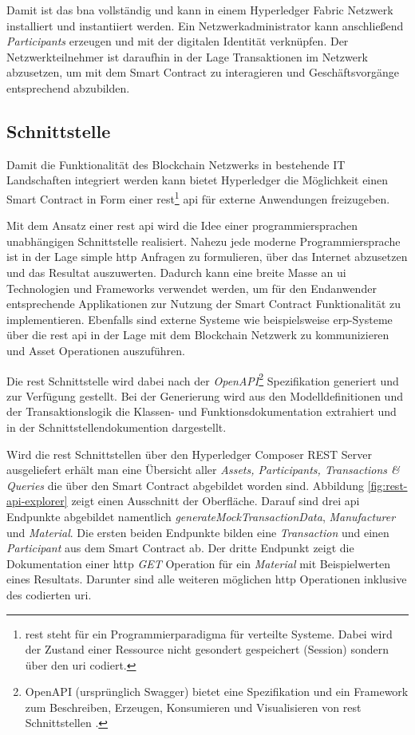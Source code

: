 \noindent
Damit ist das \acf{bna} vollständig und kann in einem Hyperledger Fabric Netzwerk installiert und instantiiert werden. Ein Netzwerkadministrator kann anschließend \textit{Participants} erzeugen und mit der digitalen Identität verknüpfen. Der Netzwerkteilnehmer ist daraufhin in der Lage Transaktionen im Netzwerk abzusetzen, um mit dem Smart Contract zu interagieren und Geschäftsvorgänge entsprechend abzubilden.

\subsection{Schnittstelle}
Damit die Funktionalität des Blockchain Netzwerks in bestehende IT Landschaften integriert werden kann bietet Hyperledger die Möglichkeit einen Smart Contract in Form einer \acs{rest}\footnote{\acf{rest} steht für ein Programmierparadigma für verteilte Systeme. Dabei wird der Zustand einer Ressource nicht gesondert gespeichert (Session) sondern über den \ac{uri} codiert.} \acs{api} für externe Anwendungen freizugeben.

Mit dem Ansatz einer \ac{rest} \ac{api} wird die Idee einer programmiersprachen unabhängigen Schnittstelle realisiert. Nahezu jede moderne Programmiersprache ist in der Lage simple \ac{http} Anfragen zu formulieren, über das Internet abzusetzen und das Resultat auszuwerten. Dadurch kann eine breite Masse an \ac{ui} Technologien und Frameworks verwendet werden, um für den Endanwender entsprechende Applikationen zur Nutzung der Smart Contract Funktionalität zu implementieren. Ebenfalls sind externe Systeme wie beispielsweise \ac{erp}-Systeme über die \ac{rest} \ac{api} in der Lage mit dem Blockchain Netzwerk zu kommunizieren und Asset Operationen auszuführen.

Die \ac{rest} Schnittstelle wird dabei nach der \textit{OpenAPI}\footnote{OpenAPI (ursprünglich Swagger) bietet eine Spezifikation und ein Framework zum Beschreiben, Erzeugen, Konsumieren und Visualisieren von \ac{rest} Schnittstellen \citep{OAI2018, Purushothaman2015}.} Spezifikation generiert und zur Verfügung gestellt. Bei der Generierung wird aus den Modelldefinitionen und der Transaktionslogik die Klassen- und Funktionsdokumentation extrahiert und in der Schnittstellendokumention dargestellt.

Wird die \ac{rest} Schnittstellen über den Hyperledger Composer REST Server ausgeliefert erhält man eine Übersicht aller \textit{Assets, Participants, Transactions \& Queries} die über den Smart Contract abgebildet worden sind. Abbildung \ref{fig:rest-api-explorer} zeigt einen Ausschnitt der Oberfläche. Darauf sind drei \ac{api} Endpunkte abgebildet namentlich \textit{generateMockTransactionData}, \textit{Manufacturer} und \textit{Material}. Die ersten beiden Endpunkte bilden eine \textit{Transaction} und einen \textit{Participant} aus dem Smart Contract ab. Der dritte Endpunkt zeigt die Dokumentation einer \ac{http} \textit{GET} Operation für ein \textit{Material} mit Beispielwerten eines Resultats. Darunter sind alle weiteren möglichen \ac{http} Operationen inklusive des codierten \ac{uri}.

